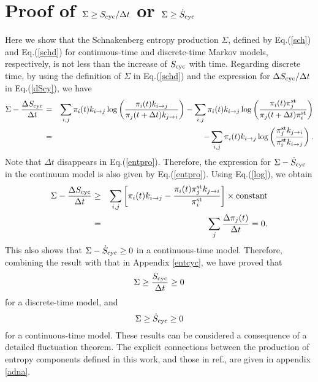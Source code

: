\documentclass[aps,pre,amsmath,amssymb,floatfix,preprint,nofootinbib]{revtex4}
\begin{document}
\section{Proof of $\Sigma \ge S_{\rm cyc}/\Delta t$ or $\Sigma \ge \dot S_{\rm cyc}$ }\label{sigcyc}
Here we show that the Schnakenberg entropy production $\Sigma$, defined by Eq.(\ref{sch}) and Eq.(\ref{schd}) for continuous-time and discrete-time Markov models, respectively, is not less than the increase of $S_{\rm cyc}$ with time. Regarding discrete time, by using the definition of $\Sigma$ in Eq.(\ref{schd}) and the expression for $\Delta S_{\rm cyc}/{\Delta t}$ in Eq.(\ref{dScy}),  we have
\begin{eqnarray}
\Sigma - \frac{\Delta S_{\rm cyc}}{\Delta t} &=& \sum_{i,j} \pi_i(t) k_{i \to j} \log \left(\frac{ \pi_i(t) k_{i \to j}}{\pi_j(t + \Delta t)  k_{j \to i}} \right) - \sum_{i,j} \pi_i(t) k_{i \to j} \log \left(\frac{ \pi_i(t)\pi^{\rm st}_j}{\pi_j(t + \Delta t)  \pi^{\rm st}_i} \right) \nonumber\\
&=& - \sum_{i,j} \pi_i(t) k_{i \to j} \log \left(\frac{ \pi^{\rm st}_j k_{j \to i}}{\pi^{\rm st}_i  k_{i \to j}} \right). \label{entpro}
\end{eqnarray}
Note that $\Delta t$ disappears in Eq.(\ref{entpro}). Therefore, the expression for $\Sigma - \dot S_{\rm cyc}$ in the continuum model is also given by Eq.(\ref{entpro}). Using Eq.(\ref{log}), we obtain
\begin{eqnarray}
\Sigma - \frac{\Delta S_{\rm cyc}}{\Delta t} &\ge&
\sum_{i,j} \left[ \pi_i(t) k_{i \to j}  -  \frac{\pi_i(t) \pi^{\rm st}_j k_{j \to i}}{\pi^{\rm st}_i}  \right] \times {\rm constant}\nonumber\\
&=& \sum_j \frac{\Delta \pi_j(t)}{\Delta t} = 0.  
\end{eqnarray}
This also shows that $\Sigma - \dot S_{\rm cyc} \ge 0$ in a continuous-time model\cite{hg}. Therefore, combining the result with that in Appendix \ref{entcyc}, we have proved that
\begin{equation}
\Sigma \ge \frac{S_{\rm cyc}}{\Delta t} \ge 0
\end{equation}
for a discrete-time model, and
\begin{equation}
\Sigma \ge \dot S_{\rm cyc} \ge 0
\end{equation}
for a continuous-time model. These results can be considered a consequence of a detailed fluctuation theorem\cite{episto}. The explicit connections between the production of entropy components defined in this work, and those in ref.\cite{episto}, are given in appendix \ref{adna}. 
\end{document}
